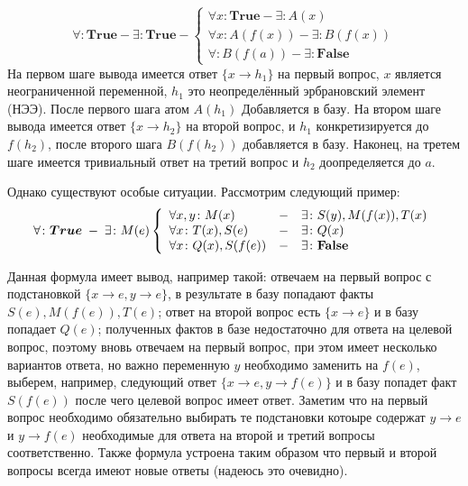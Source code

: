 \begin{equation}
	\forall\colon\boldsymbol{True} - \exists\colon\boldsymbol{True} - 
	\left\lbrace
	\begin{array}{l}
		\forall x\colon\boldsymbol{True} - \exists\colon A(x) \\
		\forall x\colon A(f(x)) - \exists\colon B(f(x)) \\
		\forall\colon B(f(a)) - \exists\colon \boldsymbol{False} 
	\end{array}\right.
\end{equation}
На первом шаге вывода имеется ответ $\{x \rightarrow h_1\}$ на первый вопрос, $x$ является неограниченной переменной, $h_1$ это неопределённый эрбрановский элемент (НЭЭ). После первого шага атом $A(h_1)$ Добавляется в базу. На втором шаге вывода имеется ответ $\{x \rightarrow h_2\}$ на второй вопрос, и $h_1$ конкретизируется до $f(h_2)$, после второго шага $B(f(h_2))$ добавляется в базу. Наконец, на третем шаге имеется тривиальный ответ на третий вопрос и $h_2$ доопределяется до $a$.   

Однако существуют особые ситуации. Рассмотрим следующий пример:
$$\forall\colon\boldsymbol{True} \; - \; \exists\colon M(e) \left\{
\begin{array}{lcl}
 \forall x,y\colon M(x) & - & \exists\colon S(y),M(f(x)),T(x) \\
 \forall x \colon T(x),S(e) & - & \exists\colon Q(x) \\
 \forall x \colon Q(x),S(f(e)) & - & \exists\colon\textbf{False}
\end{array}
\right.$$

Данная формула имеет вывод, например такой: отвечаем на первый вопрос с подстановкой $\{ x\rightarrow e, y\rightarrow e \}$, в результате в базу попадают факты $S(e),M(f(e)),T(e)$; ответ на второй вопрос есть $\{ x \rightarrow e\}$ и в базу попадает $Q(e)$; полученных фактов в базе недостаточно для ответа на целевой вопрос, поэтому вновь отвечаем на первый вопрос, при этом имеет несколько вариантов ответа, но важно переменную $y$ необходимо заменить на $f(e)$, выберем, например, следующий ответ $\{x \rightarrow e, y \rightarrow f(e) \}$ и в базу попадет факт $S(f(e))$ после чего целевой вопрос имеет ответ. 
Заметим что на первый вопрос необходимо обязательно выбирать те подстановки котоыре содержат $y \rightarrow e$ и $y \rightarrow f(e)$ необходимые для ответа на второй и третий вопросы соответственно. Также формула устроена таким образом что первый и второй вопросы всегда имеют новые ответы (надеюсь это очевидно).


